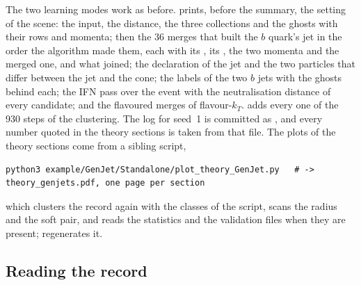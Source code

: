 The two learning modes work as before.  prints, before the
summary, the setting of the scene: the input, the distance, the three
collections and the ghosts with their rows and momenta; then the 36
merges that built the $b$ quark's \akfour jet in the order the algorithm
made them, each with its \dij, its \dR, the two momenta and the merged
one, and what joined; the declaration of the jet and the two particles
that differ between the jet and the cone; the labels of the two $b$ jets
with the ghosts behind each; the IFN pass over the event with the
neutralisation distance of every candidate; and the flavoured merges of
flavour-$k_T$.  adds every one of the 930 steps of the \akfour
clustering. The  log for seed~1 is committed as
, and every number
quoted in the theory sections is taken from that file. The plots of the
theory sections come from a sibling script,
\begin{verbatim}
python3 example/GenJet/Standalone/plot_theory_GenJet.py   # -> theory_genjets.pdf, one page per section
\end{verbatim}
which clusters the record again with the classes of the script, scans the
radius and the soft pair, and reads the  statistics and the
\FASTJET validation files when they are present; 
regenerates it.

\subsection{Reading the record}
\label{sec:family_photograph:record_format}


